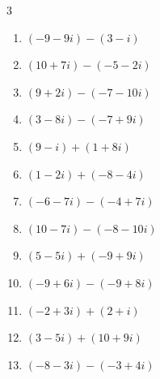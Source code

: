 \begin{multicols}{3}
\begin{enumerate}
        \phantom{$\displaystyle =2i$}

  \item $\displaystyle (-9-9i) - (3-i)$

        \phantom{$\displaystyle =-12-8i$}

  \item $\displaystyle (10+7i) - (-5-2i)$

        \phantom{$\displaystyle =15+9i$}

  \item $\displaystyle (9+2i) - (-7-10i)$

        \phantom{$\displaystyle =16+12i$}

  \item $\displaystyle (3-8i) - (-7+9i)$

        \phantom{$\displaystyle =10-17i$}

  \item $\displaystyle (9-i) + (1+8i)$

        \phantom{$\displaystyle =10+7i$}

  \item $\displaystyle (1-2i) + (-8-4i)$

        \phantom{$\displaystyle =-7-6i$}

  \item $\displaystyle (-6-7i) - (-4+7i)$

        \phantom{$\displaystyle =-2-14i$}

  \item $\displaystyle (10-7i) - (-8-10i)$

        \phantom{$\displaystyle =18+3i$}

  \item $\displaystyle (5-5i) + (-9+9i)$

        \phantom{$\displaystyle =-4+4i$}

  \item $\displaystyle (-9+6i) - (-9+8i)$

        \phantom{$\displaystyle =-2i$}

  \item $\displaystyle (-2+3i) + (2+i)$

        \phantom{$\displaystyle =4i$}

  \item $\displaystyle (3-5i) + (10+9i)$

        \phantom{$\displaystyle =13+4i$}

  \item $\displaystyle (-8-3i) - (-3+4i)$


\end{enumerate}
\end{multicols}

